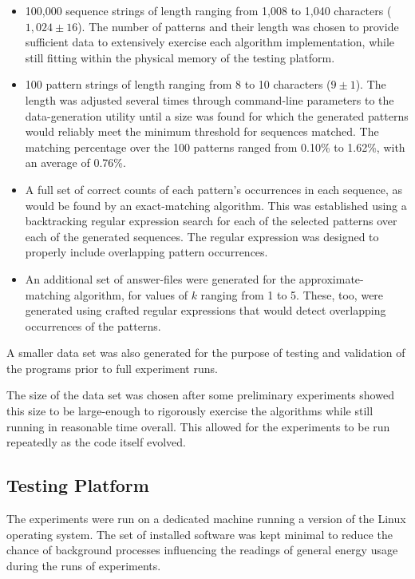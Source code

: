 \begin{itemize}
\item 100,000 sequence strings of length ranging from 1,008 to 1,040 characters ($1,024 \pm 16$). The number of patterns and their length was chosen to provide sufficient data to extensively exercise each algorithm implementation, while still fitting within the physical memory of the testing platform.
\item 100 pattern strings of length ranging from 8 to 10 characters ($9 \pm 1$). The length was adjusted several times through command-line parameters to the data-generation utility until a size was found for which the generated patterns would reliably meet the minimum threshold for sequences matched. The matching percentage over the 100 patterns ranged from 0.10\% to 1.62\%, with an average of 0.76\%.
\item A full set of correct counts of each pattern's occurrences in each sequence, as would be found by an exact-matching algorithm. This was established using a backtracking regular expression search for each of the selected patterns over each of the generated sequences. The regular expression was designed to properly include overlapping pattern occurrences.
\item An additional set of answer-files were generated for the approximate-matching algorithm, for values of $k$ ranging from 1 to 5. These, too, were generated using crafted regular expressions that would detect overlapping occurrences of the patterns.
\end{itemize}

A smaller data set was also generated for the purpose of testing and validation of the programs prior to full experiment runs.

The size of the data set was chosen after some preliminary experiments showed this size to be large-enough to rigorously exercise the algorithms while still running in reasonable time overall. This allowed for the experiments to be run repeatedly as the code itself evolved.

\subsection{Testing Platform}
\label{subsec:testing_platform}

The experiments were run on a dedicated machine running a version of the Linux operating system. The set of installed software was kept minimal to reduce the chance of background processes influencing the readings of general energy usage during the runs of experiments.

